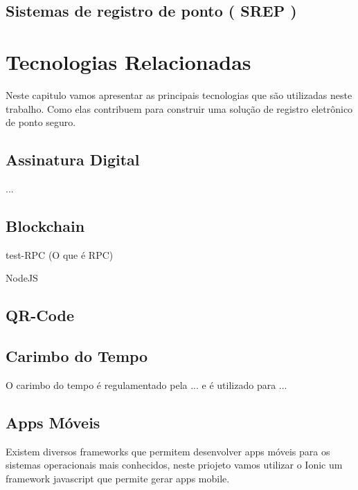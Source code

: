 \documentclass[12pt,openright,twoside,a4paper,english, brazil]{abntex2} %
\begin{document}
\section{Sistemas de registro de ponto ( SREP )}








\chapter{Tecnologias Relacionadas}


Neste capitulo vamos apresentar as principais tecnologias que são utilizadas neste trabalho. Como elas contribuem para construir uma solução de registro eletrônico de ponto seguro.

\section{Assinatura Digital}

...

\section{Blockchain}

test-RPC (O que é RPC)

NodeJS

\section{QR-Code}

\section{Carimbo do Tempo}

O carimbo do tempo é regulamentado pela ... e é utilizado para ...

\section{Apps Móveis}

Existem diversos frameworks que permitem desenvolver apps móveis para os sistemas operacionais mais conhecidos, neste priojeto vamos utilizar o Ionic um framework javascript que permite gerar apps mobile.
\end{document}
